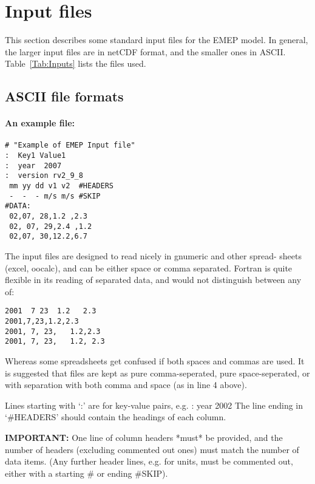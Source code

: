 \chapter{Input files}

This section describes some standard input files for the
EMEP model. In general, the larger input files
are in netCDF format, and the smaller ones in ASCII.
Table~\ref{Tab:Inputs} lists the files used.

\section{ASCII file formats}


\subsubsection*{An example file:}

\begin{verbatim}
# "Example of EMEP Input file"
:  Key1 Value1
:  year  2007
:  version rv2_9_8
 mm yy dd v1 v2  #HEADERS
 -  -  - m/s m/s #SKIP 
#DATA:
 02,07, 28,1.2 ,2.3
 02, 07, 29,2.4 ,1.2
 02,07, 30,12.2,6.7
\end{verbatim}

\bigskip

 The input files are designed to read nicely in gnumeric and other spread-
 sheets (excel, oocalc), and can be either space or comma separated.
 Fortran is quite flexible in its reading of separated data, and
would not distinguish between any of:
\begin{verbatim}
2001  7 23  1.2   2.3
2001,7,23,1.2,2.3
2001, 7, 23,   1.2,2.3
2001, 7, 23,   1.2, 2.3
\end{verbatim}

Whereas some spreadsheets get confused if both spaces and commas
are used. It is suggested that files are kept as 
pure comma-seperated,
pure space-seperated,
or with separation with both comma and space (as in line 4 above).
\bigskip

Lines starting with `:' are for key-value pairs, e.g. : year 2002
The line ending in `\#HEADERS' should contain the headings of each column.
\bigskip

{\bf IMPORTANT:} One line of column headers *must* be provided, and the
 number of headers (excluding commented out ones)  must match the number of data items.
(Any further header lines, e.g. for units, must be commented out, either with
a starting \# or ending \#SKIP).


